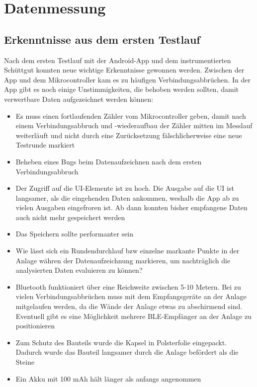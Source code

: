 \section{Datenmessung}
 
\subsection{Erkenntnisse aus dem ersten Testlauf}
Nach dem ersten Testlauf mit der Android-App und dem instrumentierten Schüttgut konnten neue wichtige Erkenntnisse gewonnen werden.
Zwischen der App und dem Mikrocontroller kam es zu häufigen Verbindungsabbrüchen. In der App gibt es noch einige Unstimmigkeiten, die behoben werden sollten, damit verwertbare Daten aufgezeichnet werden können: 

\begin{itemize}
	\item Es muss einen fortlaufenden Zähler vom Mikrocontroller geben, damit nach einem Verbindungsabbruch und -wiederaufbau der Zähler mitten im Messlauf weiterläuft und nicht durch eine Zurücksetzung fälschlicherweise eine neue Testrunde  markiert
	\item Beheben eines Bugs beim Datenaufzeichnen nach dem ersten Verbindungsabbruch
	\item Der Zugriff auf die UI-Elemente ist zu hoch. Die Ausgabe auf die UI ist langsamer, als die eingehenden Daten ankommen, weshalb die App ab zu vielen Ausgaben eingefroren ist. Ab dann konnten bisher empfangene Daten auch nicht mehr gespeichert werden
	\item Das Speichern sollte performanter sein
	\item Wie lässt sich ein Rundendurchlauf bzw einzelne markante Punkte in der Anlage währen der Datenaufzeichnung markieren, um nachträglich die analysierten Daten evaluieren zu können?
	\item Bluetooth funktioniert über eine Reichweite zwischen 5-10 Metern. Bei zu vielen Verbindungsabbrüchen muss mit dem Empfangsgeräte an der Anlage mitgelaufen werden, da die Wände der Anlage etwas zu abschirmend sind. Eventuell gibt es eine Möglichkeit mehrere BLE-Empfänger an der Anlage zu positionieren
	\item Zum Schutz des Bauteils wurde die Kapsel in Polsterfolie eingepackt. Dadurch wurde das Bauteil langsamer durch die Anlage befördert als die Steine
	\item Ein Akku mit 100 mAh hält länger als anfangs angenommen
\end{itemize}

